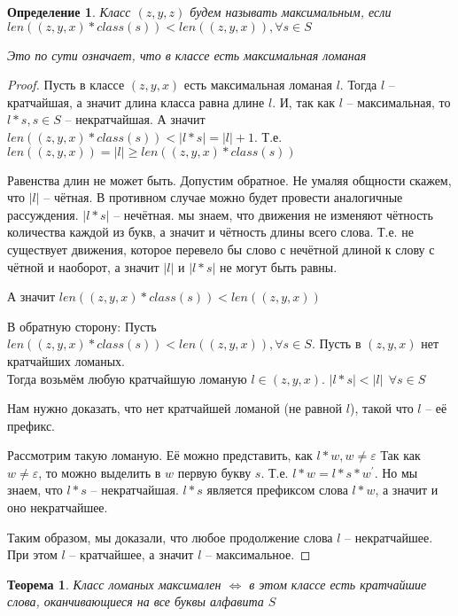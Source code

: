 \documentclass[12pt,a4paper, flushleft]{article}
\newtheorem{Def}{Определение}[section]
\newtheorem{Th}{Теорема}[section]
\newcommand{\p}[1]{#1^{\prime}}
\begin{document}
\begin{Def}
	Класс $(z, y, z)$ будем называть максимальным, если $len((z, y, x)*class(s))<len((z, y, x)) , \forall s\in S$
	
	Это по сути означает, что в классе есть максимальная ломаная
\end{Def}
\begin{proof}
	Пусть в классе $(z, y, x)$ есть максимальная ломаная $l$. Тогда $l$ -- кратчайшая, а значит длина класса равна длине $l$. И, так как $l$ -- максимальная, то $l * s, s\in S$ -- некратчайшая. А значит $len((z, y, x)*class(s)) < |l*s| = |l|+1$. Т.е. $len((z, y, x)) = |l|\geqslant  len((z, y, x)*class(s))$
	
	Равенства длин не может быть. Допустим обратное. Не умаляя общности скажем, что $|l|$ -- чётная. В противном случае можно будет провести аналогичные рассуждения. $|l * s|$ -- нечётная. мы знаем, что движения не изменяют чётность количества каждой из букв, а значит и чётность длины всего слова. Т.е. не существует движения, которое перевело бы слово с нечётной длиной к слову с чётной и наоборот, а значит $|l|$ и $|l*s|$ не могут быть равны.
	
	А значит $len((z, y, x)*class(s))<len((z, y, x))$
	
	В обратную сторону: Пусть $len((z, y, x)*class(s))<len((z, y, x)) , \forall s\in S$. Пусть в $(z, y, x)$ нет кратчайших ломаных. \\Тогда возьмём любую кратчайшую ломаную $l\in (z, y, x)$. $|l*s| < |l|~~ \forall s\in S$
	
	Нам нужно доказать, что нет кратчайшей ломаной (не равной $l$), такой что $l$ -- её префикс.
	
	Рассмотрим такую ломаную. Её можно представить, как $l * w, w\neq \varepsilon$ Так как $w\neq \varepsilon$, то можно выделить в $w$ первую букву $s$. Т.е. $l*w = l*s*\p w$. Но мы знаем, что $l*s$ -- некратчайшая. $l*s$ является префиксом слова $l*w$, а значит и оно некратчайшее. 
	
	Таким образом, мы доказали, что любое продолжение слова $l$ -- некратчайшее. При этом $l$ -- кратчайшее, а значит $l$ -- максимальное.
	
	
\end{proof}	

\begin{Th}
	Класс ломаных максимален $\Longleftrightarrow$ в этом классе есть кратчайшие слова, оканчивающиеся на все буквы алфавита $S$
\end{Th}
\end{document}
